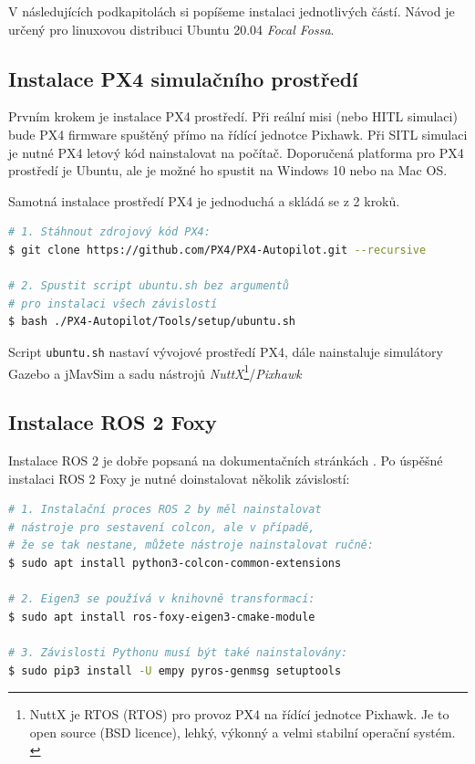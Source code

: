 V následujících podkapitolách si popíšeme instalaci jednotlivých částí. Návod je určený pro linuxovou distribuci Ubuntu 20.04 \textit{Focal Fossa}.

\subsection{Instalace PX4 simulačního prostředí}

Prvním krokem je instalace PX4 prostředí. Při reální misi (nebo \acs{HITL} simulaci) bude PX4 firmware spuštěný přímo na řídící jednotce Pixhawk. Při \acs{SITL} simulaci je nutné PX4 letový kód nainstalovat na počítač. Doporučená platforma pro PX4 prostředí je Ubuntu, ale je možné ho spustit na Windows 10 nebo na Mac OS.

Samotná instalace prostředí PX4 je jednoduchá a skládá se z 2 kroků. \cite{PX4docs}

\begin{lstlisting}[language=bash]
# 1. Stáhnout zdrojový kód PX4:
$ git clone https://github.com/PX4/PX4-Autopilot.git --recursive
 
# 2. Spustit script ubuntu.sh bez argumentů
# pro instalaci všech závislostí
$ bash ./PX4-Autopilot/Tools/setup/ubuntu.sh
\end{lstlisting}

Script \texttt{ubuntu.sh} nastaví vývojové prostředí PX4, dále nainstaluje simulátory Gazebo a jMavSim a sadu nástrojů \textit{NuttX}\footnote{NuttX je \acs{RTOS} (\acl{RTOS}) pro provoz PX4 na řídící jednotce Pixhawk. Je to open source (BSD licence), lehký, výkonný a velmi stabilní operační systém. \cite{PX4docs}}/\textit{Pixhawk}

\subsection{Instalace ROS 2 Foxy}

Instalace ROS 2 je dobře popsaná na dokumentačních stránkách \cite{ROS2INSTALL}. Po úspěšné instalaci ROS 2 Foxy je nutné doinstalovat několik závislostí:

\begin{lstlisting}[language=bash]
# 1. Instalační proces ROS 2 by měl nainstalovat 
# nástroje pro sestavení colcon, ale v případě, 
# že se tak nestane, můžete nástroje nainstalovat ručně:
$ sudo apt install python3-colcon-common-extensions
 
# 2. Eigen3 se používá v knihovně transformací:
$ sudo apt install ros-foxy-eigen3-cmake-module
 
# 3. Závislosti Pythonu musí být také nainstalovány:
$ sudo pip3 install -U empy pyros-genmsg setuptools
\end{lstlisting}

